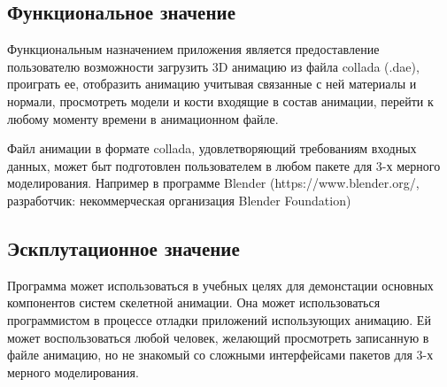 \subsection{Функциональное значение}
Функциональным назначением приложения является предоставление пользователю возможности загрузить 3D анимацию из файла collada (.dae), проиграть ее, отобразить анимацию учитывая связанные с ней материалы и нормали, просмотреть модели и кости входящие в состав анимации, перейти к любому моменту времени в анимационном файле.

\smallskip
Файл анимации в формате collada, удовлетворяющий требованиям входных данных, может быт подготовлен пользователем в любом пакете для 3-х мерного моделирования. Например в программе Blender (https://www.blender.org/, разработчик: некоммерческая организация Blender Foundation)

\subsection{Эскплутационное значение}
Программа может использоваться в учебных целях для демонстации основных компонентов систем скелетной анимации. Она может использоваться программистом в процессе отладки приложений использующих анимацию. Ей может воспользоваться любой человек, желающий просмотреть записанную в файле анимацию, но не знакомый со сложными интерфейсами пакетов для 3-х мерного моделирования.